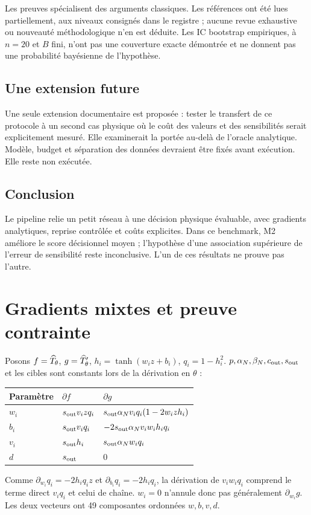 \documentclass[11pt,a4paper]{article}
\begin{document}
Les preuves spécialisent des arguments classiques.
Les références ont été lues partiellement, aux niveaux consignés dans
le registre ; aucune revue exhaustive ou nouveauté méthodologique n'en
est déduite. Les IC bootstrap empiriques, à $n=20$ et $B$ fini,
n'ont pas une couverture exacte démontrée et ne donnent pas une
probabilité bayésienne de l'hypothèse.

\subsection{Une extension future}
Une seule extension documentaire est proposée : tester le transfert de
ce protocole à un second cas physique où le coût des valeurs et des
sensibilités serait explicitement mesuré. Elle examinerait la portée
au-delà de l'oracle analytique. Modèle, budget et séparation des données
devraient être fixés avant exécution. Elle reste non exécutée.

\subsection{Conclusion}
Le pipeline relie un petit réseau à une décision physique évaluable,
avec gradients analytiques, reprise contrôlée et coûts explicites.
Dans ce benchmark, M2 améliore le score décisionnel moyen ;
l'hypothèse d'une association supérieure de l'erreur de sensibilité
reste inconclusive. L'un de ces résultats ne prouve pas l'autre.

\clearpage
\appendix
\section{Gradients mixtes et preuve contrainte}
Posons $f=\widehat T_\theta$, $g=\widehat T_\theta'$, $h_i=\tanh(w_iz+b_i)$, $q_i=1-h_i^2$.
$p,\alpha_N,\beta_N,c_{\rm out},s_{\rm out}$ et les cibles sont constants
lors de la dérivation en $\theta$ :
\begin{center}
\begin{tabular}{lll}
\toprule
Paramètre & $\partial f$ & $\partial g$\\
\midrule
$w_i$ & $s_{\rm out}v_i zq_i$
& $s_{\rm out}\alpha_Nv_iq_i(1-2w_i z h_i)$\\
$b_i$ & $s_{\rm out}v_iq_i$
& $-2s_{\rm out}\alpha_Nv_iw_i h_iq_i$\\
$v_i$ & $s_{\rm out}h_i$ & $s_{\rm out}\alpha_Nw_iq_i$\\
$d$ & $s_{\rm out}$ & $0$\\
\bottomrule
\end{tabular}
\end{center}
Comme $\partial_{w_i}q_i=-2h_iq_iz$ et
$\partial_{b_i}q_i=-2h_iq_i$, la dérivation de $v_iw_iq_i$
comprend le terme direct $v_iq_i$ et celui de chaîne.
$w_i=0$ n'annule donc pas généralement $\partial_{w_i}g$.
Les deux vecteurs ont 49 composantes ordonnées $w,b,v,d$.
\end{document}
